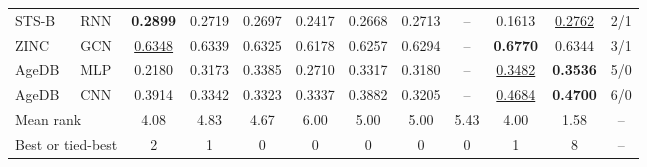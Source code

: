 \begin{table}[t]
{\begin{tabular}{llcccccccc|cc}
STS-B & RNN & \textbf{0.2899} & 0.2719 & 0.2697 & 0.2417 & 0.2668 & 0.2713 & -- & 0.1613 & \underline{0.2762} & 2/1 \\
ZINC & GCN & \underline{0.6348} & 0.6339 & 0.6325 & 0.6178 & 0.6257 & 0.6294 & -- & \textbf{0.6770} & 0.6344 & 3/1 \\
AgeDB & MLP & 0.2180 & 0.3173 & 0.3385 & 0.2710 & 0.3317 & 0.3180 & -- & \underline{0.3482} & \textbf{0.3536} & 5/0 \\
AgeDB & CNN & 0.3914 & 0.3342 & 0.3323 & 0.3337 & 0.3882 & 0.3205 & -- & \underline{0.4684} & \textbf{0.4700} & 6/0 \\
\hline
\multicolumn{2}{l}{Mean rank} & 4.08 & 4.83 & 4.67 & 6.00 & 5.00 & 5.00 & 5.43 & 4.00 & 1.58 & -- \\
\multicolumn{2}{l}{Best or tied-best} & 2 & 1 & 0 & 0 & 0 & 0 & 0 & 1 & 8 & -- \\
\hline
\end{tabular}
}
\end{table}
